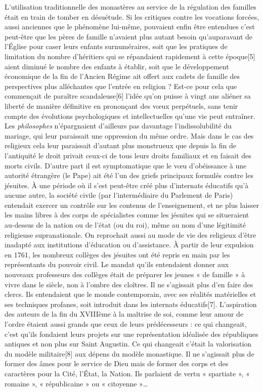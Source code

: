  L'utilisation traditionnelle des monastères au service de la régulation des familles était en train de tomber en désuétude. Si les critiques contre les vocations forcées, aussi anciennes que le phénomène lui-même, pouvaient enfin être entendues c'est peut-être que les pères de famille n'avaient plus autant besoin qu'auparavant de l'Église pour caser leurs enfants surnuméraires, soit que les pratiques de limitation du nombre d'héritiers qui se répandaient rapidement à cette époque[5] aient diminué le nombre des enfants à établir, soit que le développement économique de la fin de l'Ancien Régime ait offert aux cadets de famille des perspectives plus alléchantes que l'entrée en religion ?
 Est-ce pour cela que commençait de paraître scandaleuse[6] l'idée qu'on puisse à vingt ans aliéner sa liberté de manière définitive en prononçant des vœux perpétuels, sans tenir compte des évolutions psychologiques et intellectuelles qu'une vie peut entraîner. Les \emph{philosophes} n'épargnaient d'ailleurs pas davantage l'indissolubilité du mariage, qui leur paraissait une oppression du même ordre. Mais dans le cas des religieux cela leur paraissait d'autant plus monstrueux que depuis la fin de l'antiquité le droit privait ceux-ci de tous leurs droits familiaux et en faisait des morts civils. 
 D'autre part il est symptomatique que le vœu d'obéissance à une autorité étrangère (le Pape) ait été l'un des griefs principaux formulés contre les jésuites. À une période où il s'est peut-être créé plus d'internats éducatifs qu'à aucune autre, la société civile (par l'intermédiaire du Parlement de Paris) entendait exercer un contrôle sur les contenus de l'enseignement, et ne plus laisser les mains libres à des corps de spécialistes comme les jésuites qui se situeraient au-dessus de la nation ou de l'état (ou du roi), même au nom d'une légitimité religieuse supranationale.
 On reprochait aussi au mode de vie des religieux d'être inadapté aux institutions d'éducation ou d'assistance. À partir de leur expulsion en 1761, les nombreux collèges des jésuites ont été repris en main par les représentants du pouvoir civil. Le mandat qu'ils entendaient donner aux nouveaux professeurs des collèges était de préparer les jeunes « de famille » à vivre dans le siècle, non à l'ombre des cloîtres. Il ne s'agissait plus d'en faire des clercs. Ils entendaient que le monde contemporain, avec ses réalités matérielles et ses techniques profanes, soit introduit dans les internats éducatifs[7]. 
 L'aspiration des auteurs de la fin du XVIIIème à la maîtrise de soi, comme leur amour de l'ordre étaient aussi grands que ceux de leurs prédécesseurs : ce qui changeait, c'est qu'ils fondaient leurs projets sur une représentation idéalisée des républiques antiques et non plus sur Saint Augustin. Ce qui changeait c'était la valorisation du modèle militaire[8] aux dépens du modèle monastique. Il ne s'agissait plus de former des âmes pour le service de Dieu mais de former des corps et des caractères pour la Cité, l'État, la Nation. Ils parlaient de vertu « spartiate », « romaine », « républicaine » ou « citoyenne »…
